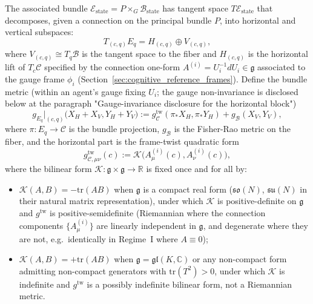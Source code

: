 \documentclass[11pt]{article}
\begin{document}
The associated bundle $\mathcal{E}_{\mathrm{state}} = P \times_G \mathcal{B}_{\mathrm{state}}$ has tangent space $T\mathcal{E}_{\mathrm{state}}$ that decomposes, given a connection on the principal bundle $P$, into horizontal and vertical subspaces:
\begin{equation}
T_{(c, q)} E_q = H_{(c, q)} \oplus V_{(c, q)},
\end{equation}
where $V_{(c, q)} \cong T_q \mathcal{B}$ is the tangent space to the fiber and $H_{(c, q)}$ is the horizontal lift of $T_c \mathcal{C}$ specified by the connection one-form $A^{(i)} = U_i^{-1}dU_i \in \mathfrak{g}$ associated to the gauge frame $\phi_i$ (Section~\ref{sec:cognitive_reference_frames}). Define the bundle metric (within an agent's gauge fixing $U_i$; the gauge non-invariance is disclosed below at the paragraph "Gauge-invariance disclosure for the horizontal block")
\begin{equation}
g_{E_q}\big|_{(c, q)}\big(X_H + X_V, Y_H + Y_V\big) := g_{\mathcal{C}}^{\mathrm{tw}}(\pi_* X_H, \pi_* Y_H) + g_{\mathcal{B}}(X_V, Y_V),
\label{eq:bundle_metric}
\end{equation}
where $\pi: E_q \to \mathcal{C}$ is the bundle projection, $g_{\mathcal{B}}$ is the Fisher-Rao metric on the fiber, and the horizontal part is the frame-twist quadratic form
\begin{equation}
g_{\mathcal{C},\mu\nu}^{\mathrm{tw}}(c) := \mathcal{K}\big(A^{(i)}_\mu(c), A^{(i)}_\nu(c)\big),
\label{eq:horizontal_metric}
\end{equation}
where the bilinear form $\mathcal{K}: \mathfrak{g} \times \mathfrak{g} \to \mathbb{R}$ is fixed once and for all by:
\begin{itemize}
\item $\mathcal{K}(A, B) = -\mathrm{tr}(AB)$ when $\mathfrak{g}$ is a compact real form ($\mathfrak{so}(N)$, $\mathfrak{su}(N)$ in their natural matrix representation), under which $\mathcal{K}$ is positive-definite on $\mathfrak{g}$ and $g^{\mathrm{tw}}$ is positive-semidefinite (Riemannian where the connection components $\{A^{(i)}_\mu\}$ are linearly independent in $\mathfrak{g}$, and degenerate where they are not, e.g.\ identically in Regime~I where $A \equiv 0$);
\item $\mathcal{K}(A, B) = +\mathrm{tr}(AB)$ when $\mathfrak{g} = \mathfrak{gl}(K, \mathbb{C})$ or any non-compact form admitting non-compact generators with $\mathrm{tr}(T^2) > 0$, under which $\mathcal{K}$ is indefinite and $g^{\mathrm{tw}}$ is a possibly indefinite bilinear form, not a Riemannian metric.
\end{itemize}
\end{document}
